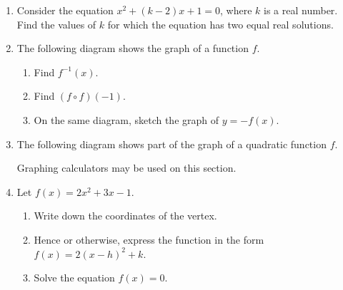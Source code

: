 \documentclass[12pt, oneside]{article}
\begin{document}
\begin{enumerate}
\item Consider the equation $x^2 + (k-2)x+1=0$, where $k$ is a real number. Find the values of $k$ for which the equation has two equal real solutions.


\newpage


    \item The following diagram shows the graph of a function $f$.\\
      \begin{enumerate}
        \item Find $f^{-1}(x)$.
        \item Find $(f \circ f)(-1)$.
        \item On the same diagram, sketch the graph of $y=-f(x)$.
      \end{enumerate}

    \item The following diagram shows part of the graph of a quadratic function $f$.

\newpage

    \newpage
    Graphing calculators may be used on this section.

    \item Let $f(x)=2x^2+3x-1$.
    \begin{enumerate}
        \item Write down the coordinates of the vertex.
        \item Hence or otherwise, express the function in the form $f(x)=2(x-h)^2 +k$.
        \item Solve the equation  $f(x)=0$.
    \end{enumerate}


\end{enumerate}
\end{document}
